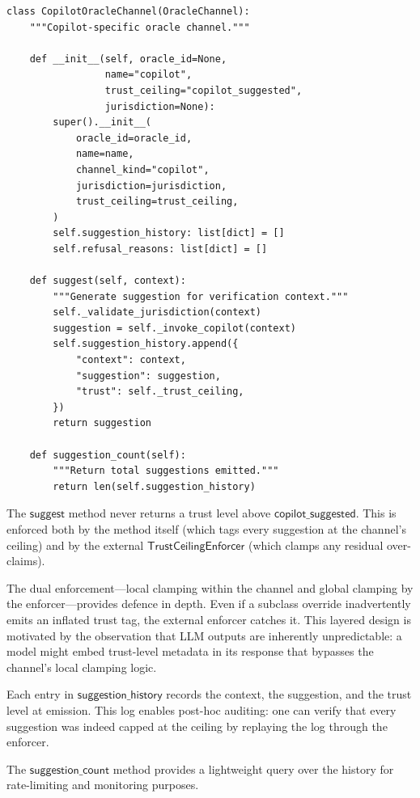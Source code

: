 \documentclass[11pt]{article}
\newcommand{\CopChan}{\texttt{CopilotOracleChannel}}
\newcommand{\copilottrust}{$\mathsf{copilot\_suggested}$}
\begin{document}
\begin{lstlisting}[style=jugeo-python,caption={\CopChan{} sketch (core interface).}]
class CopilotOracleChannel(OracleChannel):
    """Copilot-specific oracle channel."""

    def __init__(self, oracle_id=None,
                 name="copilot",
                 trust_ceiling="copilot_suggested",
                 jurisdiction=None):
        super().__init__(
            oracle_id=oracle_id,
            name=name,
            channel_kind="copilot",
            jurisdiction=jurisdiction,
            trust_ceiling=trust_ceiling,
        )
        self.suggestion_history: list[dict] = []
        self.refusal_reasons: list[dict] = []

    def suggest(self, context):
        """Generate suggestion for verification context."""
        self._validate_jurisdiction(context)
        suggestion = self._invoke_copilot(context)
        self.suggestion_history.append({
            "context": context,
            "suggestion": suggestion,
            "trust": self._trust_ceiling,
        })
        return suggestion

    def suggestion_count(self):
        """Return total suggestions emitted."""
        return len(self.suggestion_history)
\end{lstlisting}

The $\mathsf{suggest}$ method never returns a trust level above
\copilottrust{}.  This is enforced both by the method itself (which
tags every suggestion at the channel's ceiling) and by the external
$\mathsf{TrustCeilingEnforcer}$ (which clamps any residual
over-claims).

The dual enforcement---local clamping within the channel and global
clamping by the enforcer---provides defence in depth.  Even if a
subclass override inadvertently emits an inflated trust tag, the
external enforcer catches it.  This layered design is motivated by
the observation that LLM outputs are inherently unpredictable: a
model might embed trust-level metadata in its response that bypasses
the channel's local clamping logic.

Each entry in $\mathsf{suggestion\_history}$ records the context,
the suggestion, and the trust level at emission.  This log enables
post-hoc auditing: one can verify that every suggestion was indeed
capped at the ceiling by replaying the log through the enforcer.

The $\mathsf{suggestion\_count}$ method provides a lightweight
query over the history for rate-limiting and monitoring purposes.
\end{document}

